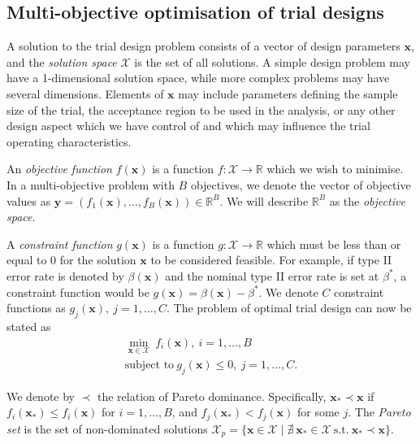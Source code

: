 \documentclass{article} %
\begin{document}

\subsection{Multi-objective optimisation of trial designs}\label{sec:optimisation}

A solution to the trial design problem consists of a vector of design parameters $\mathbf{x}$, and the \emph{solution space} $\mathcal{X}$ is the set of all solutions. A simple design problem may have a 1-dimensional solution space, while more complex problems may have several dimensions. Elements of $\mathbf{x}$ may include parameters defining the sample size of the trial, the 	acceptance region to be used in the analysis, or any other design aspect which we have control of and which may influence the trial operating characteristics.

An \emph{objective function} $f(\mathbf{x})$ is a function $f : \mathcal{X} \rightarrow \mathbb{R}$ which we wish to minimise. In a multi-objective problem with $B$ objectives, we denote the vector of objective values as $\mathbf{y} = (f_{1}(\mathbf{x}), \ldots, f_{B}(\mathbf{x})) \in \mathbb{R}^{B}$. We will describe $\mathbb{R}^{B}$ as the \emph{objective space}.

A \emph{constraint function} $g(\mathbf{x})$ is a function $g : \mathcal{X} \rightarrow \mathbb{R}$ which must be less than or equal to 0 for the solution $\mathbf{x}$ to be considered feasible. For example, if type II error rate is denoted by $\beta(\mathbf{x})$ and the nominal type II error rate is set at $\beta^{*}$, a constraint function would be $g(\mathbf{x}) = \beta(\mathbf{x}) - \beta^{*}$. We denote $C$ constraint functions as $g_{j}(\mathbf{x}),~j=1,\ldots , C$. The problem of optimal trial design can now be stated as
\begin{align}
\min_{\mathbf{x} \in \mathcal{X}} {~ f_{i}(\mathbf{x})}, ~ i = 1, \ldots , B \\
\text{subject to} ~ g_{j}(\mathbf{x}) \leq 0, ~ j = 1, \ldots , C.
\end{align}

We denote by $\prec$ the relation of Pareto dominance. Specifically, $\mathbf{x}_{*} \prec \mathbf{x}$ if $f_{i}(\mathbf{x}_{*}) \leq f_{i}(\mathbf{x})$ for $i = 1, \ldots , B$, and $f_{j}(\mathbf{x}_{*}) < f_{j}(\mathbf{x})$ for some $j$. The \emph{Pareto set} is the set of non-dominated solutions 
$\mathcal{X}_{p} = \{\mathbf{x} \in \mathcal{X} \mid \nexists ~ \mathbf{x}_{*}  \in \mathcal{X} ~\text{s.t.}~ \mathbf{x}_{*} \prec \mathbf{x} \}$. 
\end{document}
